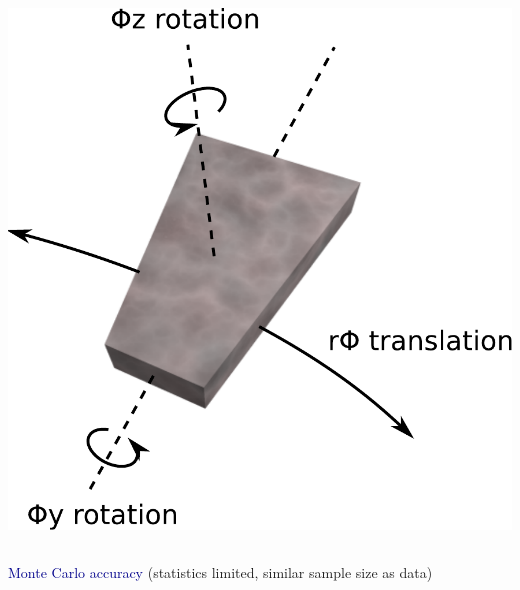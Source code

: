 \documentclass[compress]{beamer}
\begin{document}
\begin{frame}
\begin{columns}
\includegraphics[width=\linewidth]{csc_coordinates.pdf}
\end{columns}

\hspace{-0.83 cm} \textcolor{darkblue}{\Large Monte Carlo accuracy} \hfill {\scriptsize (statistics limited, similar sample size as data)}


\end{frame}
\end{document}
